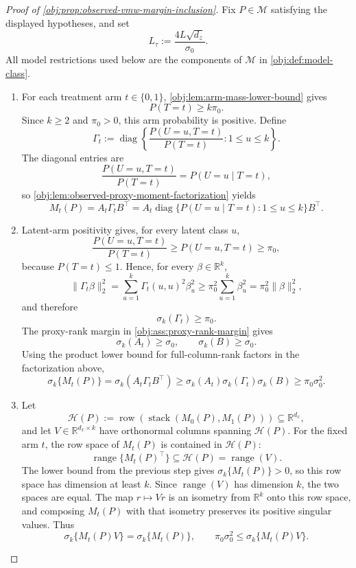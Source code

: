 \begin{proof}[Proof of \cref{obj:prop:observed-vmw-margin-inclusion}]
Fix \(P\in\mathcal M\) satisfying the displayed hypotheses, and set
\[
L_\tau:=\frac{4L\sqrt{d_z}}{\sigma_0}.
\]
All model restrictions used below are the components of \(\mathcal M\) in
\cref{obj:def:model-class}.

\begin{enumerate}
\item For each treatment arm \(t\in\{0,1\}\), \cref{obj:lem:arm-mass-lower-bound} gives
\[
P(T=t)\ge k\pi_0 .
\]
Since \(k\ge2\) and \(\pi_0>0\), this arm probability is positive.  Define
\[
\Gamma_t
:=
\operatorname{diag}\left\{
\frac{P(U=u,T=t)}{P(T=t)}:1\le u\le k
\right\}.
\]
The diagonal entries are
\[
\frac{P(U=u,T=t)}{P(T=t)}
=
P(U=u\mid T=t),
\]
so \cref{obj:lem:observed-proxy-moment-factorization} yields
\[
M_t(P)=A_t\Gamma_tB^\top
=
A_t\operatorname{diag}\{P(U=u\mid T=t):1\le u\le k\}B^\top .
\]

\item Latent-arm positivity gives, for every latent class \(u\),
\[
\frac{P(U=u,T=t)}{P(T=t)}
\ge
P(U=u,T=t)
\ge
\pi_0,
\]
because \(P(T=t)\le1\).  Hence, for every \(\beta\in\mathbb R^k\),
\[
\|\Gamma_t\beta\|_2^2
=
\sum_{u=1}^k \Gamma_t(u,u)^2\beta_u^2
\ge
\pi_0^2\sum_{u=1}^k\beta_u^2
=
\pi_0^2\|\beta\|_2^2,
\]
and therefore
\[
\sigma_k(\Gamma_t)\ge\pi_0 .
\]
The proxy-rank margin in \cref{obj:ass:proxy-rank-margin} gives
\[
\sigma_k(A_t)\ge\sigma_0,
\qquad
\sigma_k(B)\ge\sigma_0 .
\]
Using the product lower bound for full-column-rank factors in the factorization above,
\[
\sigma_k\{M_t(P)\}
=
\sigma_k(A_t\Gamma_tB^\top)
\ge
\sigma_k(A_t)\sigma_k(\Gamma_t)\sigma_k(B)
\ge
\pi_0\sigma_0^2 .
\]

\item Let
\[
\mathcal H(P):=
\operatorname{row}\!\left(\operatorname{stack}(M_0(P),M_1(P))\right)
\subseteq\mathbb R^{d_x},
\]
and let \(V\in\mathbb R^{d_x\times k}\) have orthonormal columns spanning \(\mathcal H(P)\).  For the fixed arm \(t\), the row space of \(M_t(P)\) is contained in \(\mathcal H(P)\):
\[
\operatorname{range}\{M_t(P)^\top\}\subseteq \mathcal H(P)=\operatorname{range}(V).
\]
The lower bound from the previous step gives \(\sigma_k\{M_t(P)\}>0\), so this row space has dimension at least \(k\).  Since \(\operatorname{range}(V)\) has dimension \(k\), the two spaces are equal.  The map \(r\mapsto Vr\) is an isometry from \(\mathbb R^k\) onto this row space, and composing \(M_t(P)\) with that isometry preserves its positive singular values.  Thus
\[
\sigma_k\{M_t(P)V\}
=
\sigma_k\{M_t(P)\},
\qquad
\pi_0\sigma_0^2\le \sigma_k\{M_t(P)V\}.
\]


\end{enumerate}
\end{proof}
